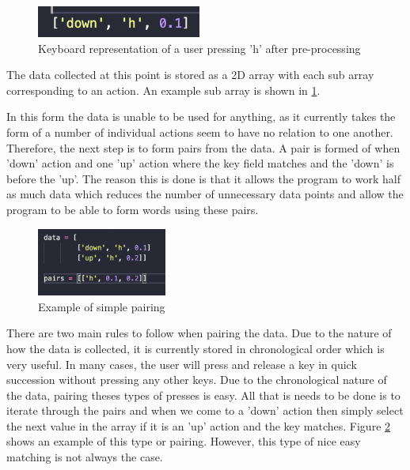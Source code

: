\documentclass[10pt,a4paper]{report}
\begin{document}
\begin{figure}
	\begin{center}
		\includegraphics[width=0.48\textwidth]{KeyboardEventPreProc}
	\end{center}
	\caption{Keyboard representation of a user pressing 'h' after pre-processing}
	\label{fig:preproc}
\end{figure}

The data collected at this point is stored as a 2D array with each sub array corresponding to an action. An example sub array is shown in \ref{fig:preproc}.

In this form the data is unable to be used for anything, as it currently takes the form of a number of individual actions seem to have no relation to one another. Therefore, the next step is to form pairs from the data. A pair is formed of when 'down' action and one 'up' action where the key field matches and the 'down' is before the 'up'. The reason this is done is that it allows the program to work half as much data which reduces the number of unnecessary data points and allow the program to be able to form words using these pairs.

\begin{figure}
	\begin{center}
		\includegraphics[width=0.38\textwidth]{SimplePairing}
	\end{center}
	\caption{Example of simple pairing}
	\label{fig:SimpPair}
\end{figure}

There are two main rules to follow when pairing the data. Due to the nature of how the data is collected, it is currently stored in chronological order which is very useful. In many cases, the user will press and release a key in quick succession without pressing any other keys. Due to the chronological nature of the data, pairing theses types of presses is easy. All that is needs to be done is to iterate through the pairs and when we come to a 'down' action then simply select the next value in the array if it is an 'up' action and the key matches. Figure \ref{fig:SimpPair} shows an example of this type or pairing. However, this type of nice easy matching is not always the case.
\end{document}
